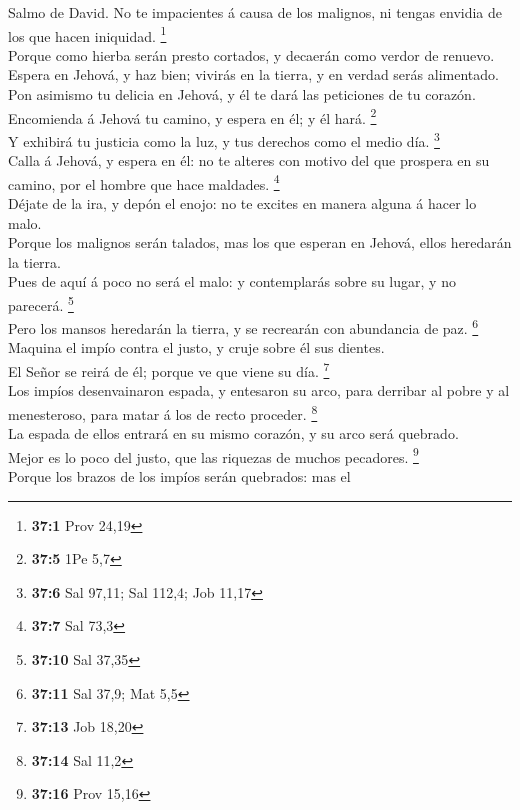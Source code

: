  Salmo de David. No te impacientes á causa de los
malignos, ni tengas envidia de los que hacen iniquidad. \footnote{\textbf{37:1}
  Prov 24,19}\\
 Porque como hierba serán presto cortados, y decaerán como
verdor de renuevo.\\
 Espera en Jehová, y haz bien; vivirás en la tierra, y en
verdad serás alimentado.\\
 Pon asimismo tu delicia en Jehová, y él te dará las
peticiones de tu corazón.\\
 Encomienda á Jehová tu camino, y espera en él; y él hará.
\footnote{\textbf{37:5} 1Pe 5,7}\\
 Y exhibirá tu justicia como la luz, y tus derechos como
el medio día. \footnote{\textbf{37:6} Sal 97,11; Sal 112,4; Job 11,17}\\
 Calla á Jehová, y espera en él: no te alteres con motivo
del que prospera en su camino, por el hombre que hace maldades.
\footnote{\textbf{37:7} Sal 73,3}\\
 Déjate de la ira, y depón el enojo: no te excites en
manera alguna á hacer lo malo.\\
 Porque los malignos serán talados, mas los que esperan en
Jehová, ellos heredarán la tierra.\\
 Pues de aquí á poco no será el malo: y contemplarás
sobre su lugar, y no parecerá. \footnote{\textbf{37:10} Sal 37,35}\\
 Pero los mansos heredarán la tierra, y se recrearán con
abundancia de paz. \footnote{\textbf{37:11} Sal 37,9; Mat 5,5}\\
 Maquina el impío contra el justo, y cruje sobre él sus
dientes.\\
 El Señor se reirá de él; porque ve que viene su día.
\footnote{\textbf{37:13} Job 18,20}\\
 Los impíos desenvainaron espada, y entesaron su arco,
para derribar al pobre y al menesteroso, para matar á los de recto
proceder. \footnote{\textbf{37:14} Sal 11,2}\\
 La espada de ellos entrará en su mismo corazón, y su
arco será quebrado.\\
 Mejor es lo poco del justo, que las riquezas de muchos
pecadores. \footnote{\textbf{37:16} Prov 15,16}\\
 Porque los brazos de los impíos serán quebrados: mas el
